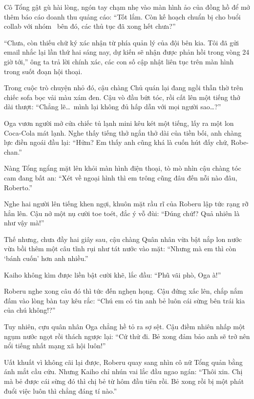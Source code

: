 \documentclass[../main.tex]{subfiles}
\begin{document}
Cô Tổng gật gù hài lòng, ngón tay chạm nhẹ vào màn hình ảo của đồng hồ để mở thêm báo cáo doanh thu quảng cáo: ``Tốt lắm. Còn kế hoạch chuẩn bị cho buổi collab với nhóm \hls\ bên đó, các thủ tục đã xong hết chưa?''

``Chưa, còn thiếu chữ ký xác nhận từ phía quản lý của đội bên kia. Tôi đã gửi email nhắc lại lần thứ hai sáng nay, dự kiến sẽ nhận được phản hồi trong vòng 24 giờ tới,'' ông ta trả lời chính xác, các con số cập nhật liên tục trên màn hình trong suốt đoạn hội thoại.

Trong cuộc trò chuyện nhỏ đó, cậu chàng Chủ quán lại đang ngồi thẫn thờ trên chiếc sofa bọc vải màu xám đen. Cậu vò đầu bứt tóc, rồi cất lên một tiếng thở dài thượt: ``Chẳng lẽ\dots\ mình lại không đủ hấp dẫn với mọi người sao\dots?''


Oga vươn người mở cửa chiếc tủ lạnh mini kêu két một tiếng, lấy ra một lon Coca-Cola mát lạnh. Nghe thấy tiếng thở ngắn thở dài của tiền bối, anh chàng lực điền ngoái đầu lại: ``Hửm? Em thấy anh cũng khá là cuốn hút đấy chứ, Robe-chan.''

Nàng Tổng ngẩng mặt lên khỏi màn hình điện thoại, tò mò nhìn cậu chàng tóc cam đang bất an: ``Xét về ngoại hình thì em trông cũng đâu đến nỗi nào đâu, Roberto.''

Nghe hai người lên tiếng khen ngợi, khuôn mặt rầu rĩ của Roberu lập tức rạng rỡ hẳn lên. Cậu nở một nụ cười toe toét, đắc ý vỗ đùi: ``Đúng chứ!? Quả nhiên là như vậy mà!''

Thế nhưng, chưa đầy hai giây sau, cậu chàng Quân nhân vừa bật nắp lon nước vừa bồi thêm một câu tĩnh rụi như tát nước vào mặt: ``Nhưng mà em thì còn `bánh cuốn' hơn anh nhiều.''

Kaiho không kìm được liền bật cười khẽ, lắc đầu: ``Phũ vãi phò, Oga à!''

Roberu nghe xong câu đó thì tức đến nghẹn họng. Cậu đứng xấc lên, chắp nắm đấm vào lòng bàn tay kêu rắc: ``Chú em có tin anh bẻ luôn cái sừng bên trái kia của chú không!?''


Tuy nhiên, cựu quân nhân Oga chẳng hề tỏ ra sợ sệt. Cậu điềm nhiên nhấp một ngụm nước ngọt rồi thách ngược lại: ``Cứ thử đi. Bẻ xong đảm bảo anh sẽ trở nên nổi tiếng nhất mạng xã hội luôn!''

Uất khuất vì không cãi lại được, Roberu quay sang nhìn cô nữ Tổng quản bằng ánh mắt cầu cứu. Nhưng Kaiho chỉ nhún vai lắc đầu ngao ngán: ``Thôi xin. Chị mà bẻ được cái sừng đó thì chị bẻ từ hôm đầu tiên rồi. Bẻ xong rồi bị một phát đuổi việc luôn thì chẳng đáng tí nào.''
\end{document}

